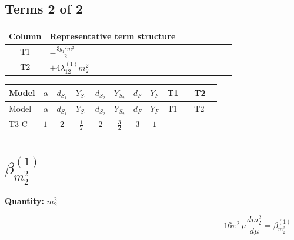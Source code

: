 \documentclass[8pt]{article}
\begin{document}
\begin{landscape}
\subsection*{Terms 2 of 2}
\begin{center}
\begin{tabular}{@{}c >{\raggedright\arraybackslash}p{0.82\linewidth}@{}}
\toprule
Column & Representative term structure \\
\midrule
T1 & \(\displaystyle -\frac{3 {g_1}^2 {m_1^2}}{2}\) \\
\midrule
T2 & \(\displaystyle +4 {\lambda_{12}^{(1)}} {m_2^2}\) \\
\midrule
\bottomrule
\end{tabular}
\end{center}
\smallskip
\tiny
\begin{longtable}{@{}llcccccc >{\raggedright\arraybackslash}p{0.21\linewidth} >{\raggedright\arraybackslash}p{0.21\linewidth}@{}}
\toprule
Model & $\alpha$ & $d_{S_1}$ & $Y_{S_1}$ & $d_{S_2}$ & $Y_{S_2}$ & $d_F$ & $Y_F$ & T1 & T2 \\
\midrule
\endfirsthead
\toprule
Model & $\alpha$ & $d_{S_1}$ & $Y_{S_1}$ & $d_{S_2}$ & $Y_{S_2}$ & $d_F$ & $Y_F$ & T1 & T2 \\
\midrule
\endhead
T3-C & $1$ & $2$ & $\frac{1}{2}$ & $2$ & $\frac{3}{2}$ & $3$ & $1$ & \scriptsize\adjustbox{max width=\linewidth}{$\begin{gathered} -\frac{3 {g_1}^2 {m_1^2}}{2}\end{gathered}$} & \scriptsize\adjustbox{max width=\linewidth}{$\begin{gathered} +4 {\lambda_{12}^{(1)}} {m_2^2}\end{gathered}$} \\
\midrule
\bottomrule
\end{longtable}
\clearpage
\section*{$\beta_{m_2^2}^{(1)}$}
\noindent\textbf{Quantity: }$m_2^2$\par\smallskip
\[16\pi^2\,\mu\frac{d m_2^2}{d\mu}=\beta_{m_2^2}^{(1)}\]

\end{landscape}
\end{document}
